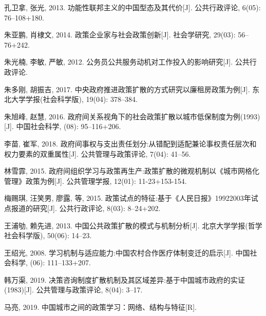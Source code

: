 \documentclass[
  12pt,
]{ctexart}
\newlength{\cslhangindent}
\newlength{\cslentryspacingunit} %
\newenvironment{CSLReferences}[2] %
 {%
  \setlength{\parindent}{0pt}
  \ifodd #1
  \let\oldpar\par
  \def\par{\hangindent=\cslhangindent\oldpar}
  \fi
  \setlength{\parskip}{#2\cslentryspacingunit}
 }%
 {}
\begin{document}
\begin{CSLReferences}{1}{0}
\leavevmode{}%
孔卫拿, 张光, 2013. {功能性联邦主义的中国型态及其代价}{[}J{]}. 公共行政评论, 6(05): 76--108+180.

\leavevmode{}%
朱亚鹏, 肖棣文, 2014. {政策企业家与社会政策创新}{[}J{]}. 社会学研究, 29(03): 56--76+242.

\leavevmode{}%
朱光楠, 李敏, 严敏, 2012. 公务员公共服务动机对工作投入的影响研究{[}J{]}. 公共行政评论.

\leavevmode{}%
朱多刚, 胡振吉, 2017. 中央政府推进政策扩散的方式研究\textemdash\textemdash 以廉租房政策为例{[}J{]}. 东北大学学报(社会科学版), 19(04): 378--384.

\leavevmode{}%
朱旭峰, 赵慧, 2016. {政府间关系视角下的社会政策扩散\textemdash\textemdash 以城市低保制度为例(1993)}{[}J{]}. 中国社会科学, (08): 95--116+206.

\leavevmode{}%
李苗, 崔军, 2018. {政府间事权与支出责任划分:从错配到适配\textemdash\textemdash 兼论事权责任层次和权力要素的双重属性}{[}J{]}. 公共管理与政策评论, 7(04): 41--56.

\leavevmode{}%
林雪霏, 2015. {政府间组织学习与政策再生产:政策扩散的微观机制\textemdash\textemdash 以{《城市网格化管理》}政策为例}{[}J{]}. 公共管理学报, 12(01): 11-23+153-154.

\leavevmode{}%
梅赐琪, 汪笑男, 廖露, 等, 2015. {政策试点的特征:基于《人民日报》1992\textemdash 2003年试点报道的研究}{[}J{]}. 公共行政评论, 8(03): 8--24+202.

\leavevmode{}%
王浦劬, 赖先进, 2013. {中国公共政策扩散的模式与机制分析}{[}J{]}. 北京大学学报(哲学社会科学版), 50(06): 14--23.

\leavevmode{}%
王绍光, 2008. {学习机制与适应能力:中国农村合作医疗体制变迁的启示}{[}J{]}. 中国社会科学, (06): 111--133+207.

\leavevmode{}%
韩万渠, 2019. {决策咨询制度扩散机制及其区域差异:基于中国城市政府的实证(1983)}{[}J{]}. 公共管理与政策评论, 8(04): 3--17.

\leavevmode{}%
马亮, 2019. 中国城市之间的政策学习：网络、结构与特征{[}R{]}.

\end{CSLReferences}
\end{document}
